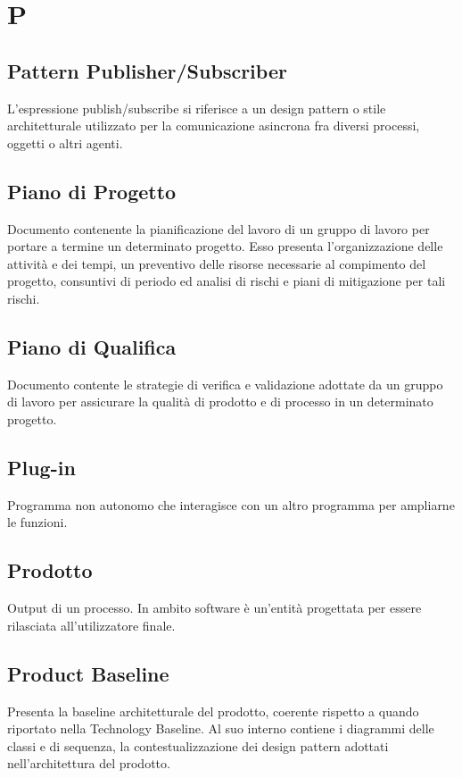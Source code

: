 \section*{P}

\subsection{Pattern Publisher/Subscriber} 
L'espressione publish/subscribe si riferisce a un design pattern o stile architetturale utilizzato per la comunicazione asincrona fra diversi processi, oggetti o altri agenti.
 
\subsection{Piano di Progetto}
Documento contenente la pianificazione del lavoro di un gruppo di lavoro per portare a termine un determinato progetto. Esso presenta l'organizzazione delle attività e dei tempi, un preventivo delle risorse necessarie al compimento del progetto, consuntivi di periodo ed analisi di rischi e piani di mitigazione per tali rischi.

\subsection{Piano di Qualifica}
Documento contente le strategie di verifica e validazione adottate da un gruppo di lavoro per assicurare la qualità di prodotto e di processo in un determinato progetto.

\subsection{Plug-in} 
Programma non autonomo che interagisce con un altro programma per ampliarne le funzioni.

\subsection{Prodotto}
Output di un processo. In ambito software è un'entità progettata per essere rilasciata all'utilizzatore finale.

\subsection{Product Baseline}
Presenta la baseline architetturale del prodotto, coerente rispetto a quando riportato nella Technology Baseline. Al suo interno contiene i diagrammi delle classi e di sequenza, la contestualizzazione dei design pattern adottati nell'architettura del prodotto.


